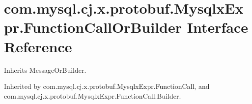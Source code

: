 \hypertarget{interfacecom_1_1mysql_1_1cj_1_1x_1_1protobuf_1_1_mysqlx_expr_1_1_function_call_or_builder}{}\section{com.\+mysql.\+cj.\+x.\+protobuf.\+Mysqlx\+Expr.\+Function\+Call\+Or\+Builder Interface Reference}
\label{interfacecom_1_1mysql_1_1cj_1_1x_1_1protobuf_1_1_mysqlx_expr_1_1_function_call_or_builder}


Inherits Message\+Or\+Builder.



Inherited by com.\+mysql.\+cj.\+x.\+protobuf.\+Mysqlx\+Expr.\+Function\+Call, and com.\+mysql.\+cj.\+x.\+protobuf.\+Mysqlx\+Expr.\+Function\+Call.\+Builder.


